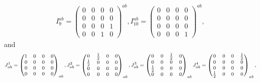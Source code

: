 \begin{equation}
\begin{gathered}
  I^{ab}_9 = \begin{pmatrix}0 & 0 & 0 & 0 \\ 0 & 0 & 0 & 0 \\ 0 & 0 & 0 & 1 \\ 0 & 0 & 1 & 0\end{pmatrix}^{ab}, I^{ab}_{10} = \begin{pmatrix}0 & 0 & 0 & 0 \\ 0 & 0 & 0 & 0 \\ 0 & 0 & 0 & 0 \\ 0 & 0 & 0 & 1\end{pmatrix}^{ab},
  \end{gathered}
\end{equation}
and
\begin{equation}\label{inter_metric_J}
  \footnotesize
  \begin{gathered}
    J_{ab}^1 = \begin{pmatrix}1 & 0 & 0 & 0 \\ 0 & 0 & 0 & 0 \\ 0 & 0 & 0 & 0 \\ 0 & 0 & 0 & 0\end{pmatrix}_{ab}, J_{ab}^2 = \begin{pmatrix}0 & \frac{1}{2} & 0 & 0 \\ \frac{1}{2} & 0 & 0 & 0 \\ 0 & 0 & 0 & 0 \\ 0 & 0 & 0 & 0\end{pmatrix}_{ab}, J_{ab}^3 = \begin{pmatrix}0 & 0 & \frac{1}{2} & 0 \\ 0 & 0 & 0 & 0 \\ \frac{1}{2} & 0 & 0 & 0 \\ 0 & 0 & 0 & 0\end{pmatrix}_{ab} J_{ab}^4 = \begin{pmatrix}0 & 0 & 0 & \frac{1}{2} \\ 0 & 0 & 0 & 0 \\ 0 & 0 & 0 & 0 \\ \frac{1}{2} & 0 & 0 & 0\end{pmatrix}_{ab}, \\

\end{gathered}
\end{equation}
